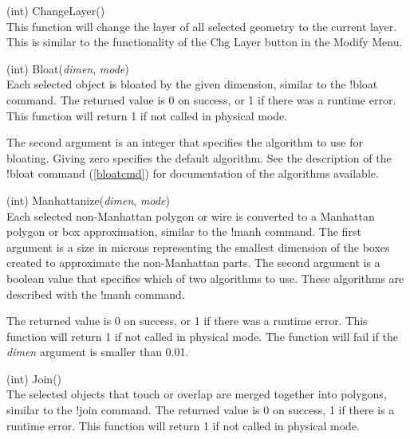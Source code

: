 \begin{description}
\item{(int) \vt ChangeLayer()}\\
This function will change the layer of all selected geometry to the
current layer.  This is similar to the functionality of the {\cb
Chg Layer} button in the {\cb Modify Menu}.

\item{(int) \vt Bloat({\it dimen\/}, {\it mode\/})}\\
Each selected object is bloated by the given dimension, similar to the
{\cb !bloat} command.  The returned value is 0 on success, or 1 if
there was a runtime error.  This function will return 1 if not called
in physical mode.

The second argument is an integer that specifies the algorithm to use
for bloating.  Giving zero specifies the default algorithm.  See the
description of the {\cb !bloat} command (\ref{bloatcmd}) for
documentation of the algorithms available. 

\item{(int) \vt Manhattanize({\it dimen\/}, {\it mode\/})}\\
Each selected non-Manhattan polygon or wire is converted to a
Manhattan polygon or box approximation, similar to the {\cb !manh}
command.  The first argument is a size in microns representing the
smallest dimension of the boxes created to approximate the
non-Manhattan parts.  The second argument is a boolean value that
specifies which of two algorithms to use.  These algorithms are
described with the {\cb !manh} command.

The returned value is 0 on success, or 1 if there was a runtime error. 
This function will return 1 if not called in physical mode.  The
function will fail if the {\it dimen} argument is smaller than 0.01.

\item{(int) \vt Join()}\\
The selected objects that touch or overlap are merged together into
polygons, similar to the {\cb !join} command.  The returned value is 0
on success, 1 if there is a runtime error.  This function will return
1 if not called in physical mode.


\end{description}
